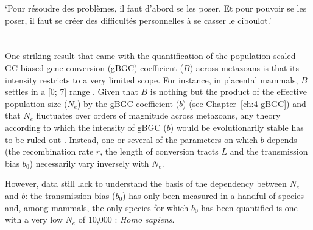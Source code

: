 \begin{savequote}[8cm]
‘Pour résoudre des problèmes, il faut d'abord se les poser. Et pour pouvoir se les poser, il faut se créer des difficultés personnelles à se casser le ciboulot.’

\end{savequote}

\chapter*{\label{ch:objectives}}





One striking result that came with the quantification of the population-scaled GC-biased gene conversion (gBGC) coefficient ($B$) across metazoans \citep{galtier2018codon} is that its intensity restricts to a very limited scope.
For instance, in placental mammals, $B$ settles in a [0; 7] range \citep{lartillot2013phylogenetic}.
Given that $B$ is nothing but the product of the effective population size ($N_e$) by the gBGC coefficient ($b$) (see Chapter~\ref{ch:4-gBGC}) and that $N_e$ fluctuates over orders of magnitude across metazoans, any theory according to which the intensity of gBGC ($b$) would be evolutionarily stable has to be ruled out \citep{galtier2018codon}.
Instead, one or several of the parameters on which $b$ depends (the recombination rate $r$, the length of conversion tracts $L$ and the transmission bias $b_0$) necessarily vary inversely with $N_e$.

However, data still lack to understand the basis of the dependency between $N_e$ and $b$: the transmission bias ($b_0$) has only been measured in a handful of species \citep{mancera2008highresolution, si2015widely, williams2015noncrossover, halldorsson2016rate, keith2016high, smeds2016highresolution} and, among mammals, the only species for which $b_0$ has been quantified is one with a very low $N_e$ of 10,000 \citep{takahata1993allelic,erlich1996hla,harding1997archaic,charlesworth2009fundamental,yu2004nucleotide}: \textit{Homo sapiens}.

